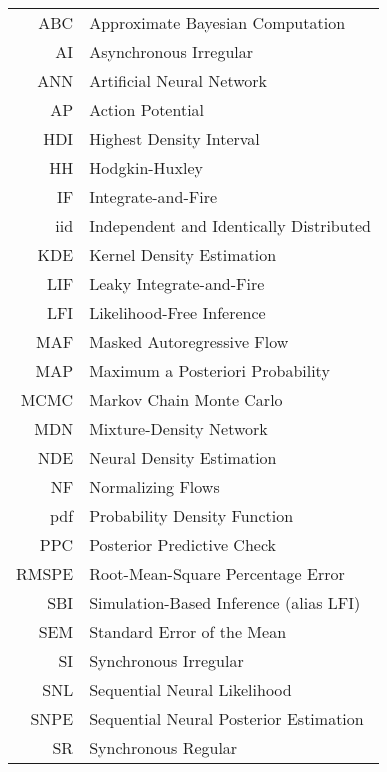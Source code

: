 \begin{longtable}{rl}
    ABC & Approximate Bayesian Computation \\
    AI & Asynchronous Irregular \\
    ANN & Artificial Neural Network \\
    AP & Action Potential \\
    HDI & Highest Density Interval \\
    HH & Hodgkin-Huxley \\
    IF & Integrate-and-Fire \\
    iid & Independent and Identically Distributed \\
    KDE & Kernel Density Estimation \\
    LIF & Leaky Integrate-and-Fire \\
    LFI & Likelihood-Free Inference \\
    MAF & Masked Autoregressive Flow \\
    MAP &  Maximum a Posteriori Probability \\
    MCMC & Markov Chain Monte Carlo \\
    MDN & Mixture-Density Network \\
    NDE & Neural Density Estimation \\
    NF & Normalizing Flows \\
    pdf & Probability Density Function \\
    PPC & Posterior Predictive Check \\
    RMSPE & Root-Mean-Square Percentage Error \\
    SBI & Simulation-Based Inference (alias LFI) \\
    SEM & Standard Error of the Mean \\
    SI & Synchronous Irregular \\
    SNL & Sequential Neural Likelihood \\
    SNPE & Sequential Neural Posterior Estimation \\
    SR & Synchronous Regular \\
\end{longtable}

